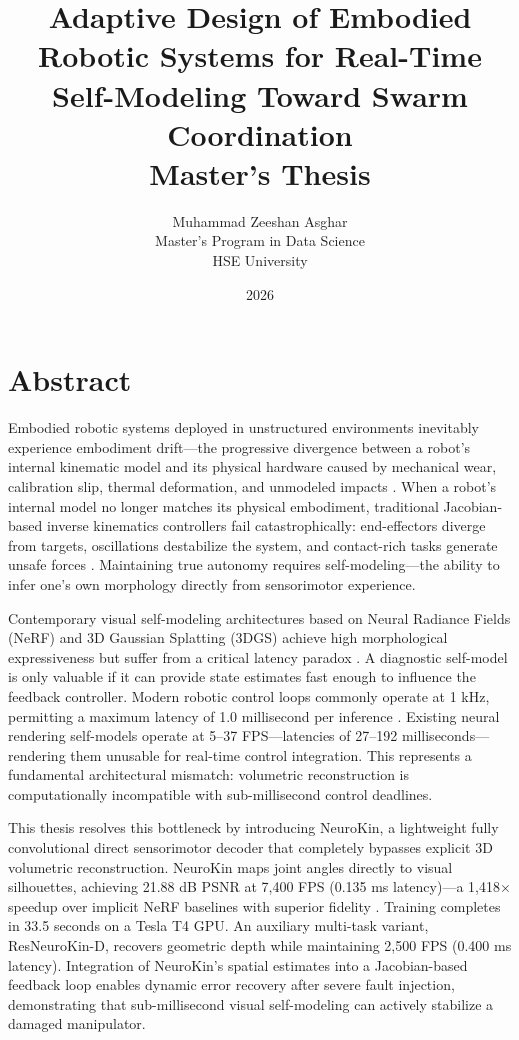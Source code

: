 \documentclass[12pt,a4paper,oneside]{report}
\title{
    \vspace{2cm}
    \textbf{\Large Adaptive Design of Embodied Robotic Systems for Real-Time Self-Modeling Toward Swarm Coordination} \\
    \vspace{1cm}
    \large Master's Thesis
}
\author{
    Muhammad Zeeshan Asghar \\
    Master's Program in Data Science \\
    HSE University
}
\date{\vspace{1cm} 2026}
\begin{document}
\maketitle
\clearpage

\chapter*{Abstract}

Embodied robotic systems deployed in unstructured environments inevitably experience embodiment drift---the progressive divergence between a robot's internal kinematic model and its physical hardware caused by mechanical wear, calibration slip, thermal deformation, and unmodeled impacts \cite{bongard2006resilient, cully2015robots}. When a robot's internal model no longer matches its physical embodiment, traditional Jacobian-based inverse kinematics controllers fail catastrophically: end-effectors diverge from targets, oscillations destabilize the system, and contact-rich tasks generate unsafe forces \cite{kwiatkowski2019task, chen2022full}. Maintaining true autonomy requires self-modeling---the ability to infer one's own morphology directly from sensorimotor experience.

Contemporary visual self-modeling architectures based on Neural Radiance Fields (NeRF) and 3D Gaussian Splatting (3DGS) achieve high morphological expressiveness but suffer from a critical latency paradox \cite{hu2024teaching, hu2025learning}. A diagnostic self-model is only valuable if it can provide state estimates fast enough to influence the feedback controller. Modern robotic control loops commonly operate at 1 kHz, permitting a maximum latency of 1.0 millisecond per inference \cite{siciliano2009robotics}. Existing neural rendering self-models operate at 5--37 FPS---latencies of 27--192 milliseconds---rendering them unusable for real-time control integration. This represents a fundamental architectural mismatch: volumetric reconstruction is computationally incompatible with sub-millisecond control deadlines.

This thesis resolves this bottleneck by introducing NeuroKin, a lightweight fully convolutional direct sensorimotor decoder that completely bypasses explicit 3D volumetric reconstruction. NeuroKin maps joint angles directly to visual silhouettes, achieving 21.88 dB PSNR at 7,400 FPS (0.135 ms latency)---a 1,418$\times$ speedup over implicit NeRF baselines with superior fidelity \cite{hu2024teaching}. Training completes in 33.5 seconds on a Tesla T4 GPU. An auxiliary multi-task variant, ResNeuroKin-D, recovers geometric depth while maintaining 2,500 FPS (0.400 ms latency). Integration of NeuroKin's spatial estimates into a Jacobian-based feedback loop enables dynamic error recovery after severe fault injection, demonstrating that sub-millisecond visual self-modeling can actively stabilize a damaged manipulator.
\end{document}
